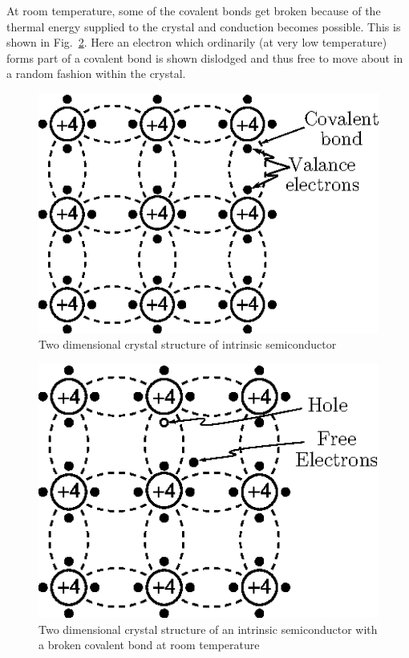At room temperature, some of the covalent bonds get broken because of the thermal energy supplied to the crystal and conduction becomes possible. This is shown in Fig.~\ref{fig1.7}. Here an electron which ordinarily (at very low temperature) forms part of a covalent bond is shown dislodged and thus free to move about in a random fashion within the crystal.
\begin{figure}[H]
\centering
\includegraphics{chap1/fig1.6.eps}
\caption{Two dimensional crystal structure of intrinsic semiconductor}\label{fig1.6}
\end{figure}

\begin{figure}[H]
\centering
\includegraphics{chap1/fig1.7.eps}
\caption{Two dimensional crystal structure of an intrinsic semiconductor with a broken covalent bond at room temperature}\label{fig1.7}
\end{figure}

